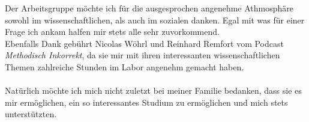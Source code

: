 \documentclass[bachelor,       %
               twoside,        %
               BCOR10mm,       %
               english,ngerman, %
               ]{GAUBM}
\begin{document}
Der Arbeitsgruppe möchte ich für die ausgesprochen angenehme Athmosphäre sowohl im wissenschaftlichen, als auch im sozialen danken.
Egal mit was für einer Frage ich ankam halfen mir stets alle sehr zuvorkommend.\\




Ebenfalls Dank gebührt Nicolas Wöhrl und Reinhard Remfort vom Podcast \textit{Methodisch Inkorrekt}, da sie mir mit ihren interessanten wissenschaftlichen Themen zahlreiche Stunden im Labor angenehm gemacht haben.\\\\

Natürlich möchte ich mich nicht zuletzt bei meiner Familie bedanken, dass sie es mir ermöglichen, ein so interessantes Studium zu ermöglichen und mich stets unterstützten.


\Declaration
\end{document}
